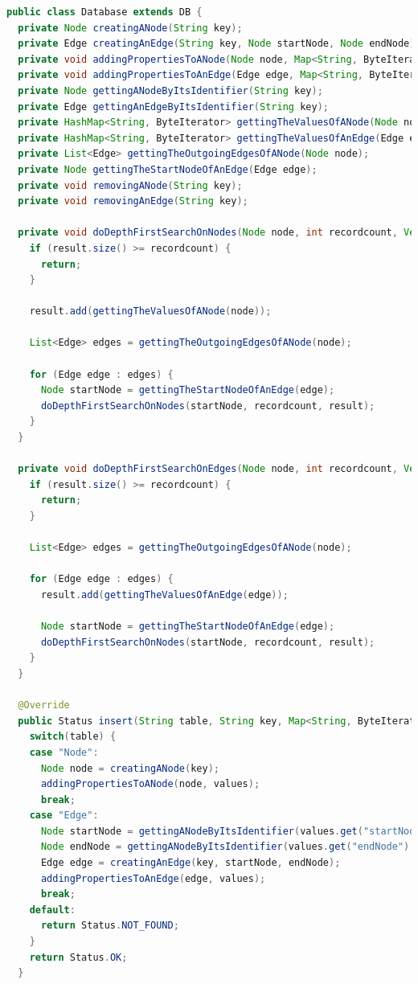 \begin{lstlisting}[language={Java},label={lst:databaseTemplate},caption={Generic example of a database implementation with the use of graph data.},captionpos=b]
public class Database extends DB {
  private Node creatingANode(String key);
  private Edge creatingAnEdge(String key, Node startNode, Node endNode);
  private void addingPropertiesToANode(Node node, Map<String, ByteIterator> values);
  private void addingPropertiesToAnEdge(Edge edge, Map<String, ByteIterator> values);
  private Node gettingANodeByItsIdentifier(String key);
  private Edge gettingAnEdgeByItsIdentifier(String key);
  private HashMap<String, ByteIterator> gettingTheValuesOfANode(Node node);
  private HashMap<String, ByteIterator> gettingTheValuesOfAnEdge(Edge edge);
  private List<Edge> gettingTheOutgoingEdgesOfANode(Node node);
  private Node gettingTheStartNodeOfAnEdge(Edge edge);
  private void removingANode(String key);
  private void removingAnEdge(String key);

  private void doDepthFirstSearchOnNodes(Node node, int recordcount, Vector<HashMap<String, ByteIterator>> result) {
    if (result.size() >= recordcount) {
      return;
    }

    result.add(gettingTheValuesOfANode(node));

    List<Edge> edges = gettingTheOutgoingEdgesOfANode(node);

    for (Edge edge : edges) {
      Node startNode = gettingTheStartNodeOfAnEdge(edge);
      doDepthFirstSearchOnNodes(startNode, recordcount, result);
    }
  }

  private void doDepthFirstSearchOnEdges(Node node, int recordcount, Vector<HashMap<String, ByteIterator>> result) {
    if (result.size() >= recordcount) {
      return;
    }

    List<Edge> edges = gettingTheOutgoingEdgesOfANode(node);

    for (Edge edge : edges) {
      result.add(gettingTheValuesOfAnEdge(edge));

      Node startNode = gettingTheStartNodeOfAnEdge(edge);
      doDepthFirstSearchOnNodes(startNode, recordcount, result);
    }
  }

  @Override
  public Status insert(String table, String key, Map<String, ByteIterator> values) {
    switch(table) {
    case "Node":
      Node node = creatingANode(key);
      addingPropertiesToANode(node, values);
      break;
    case "Edge":
      Node startNode = gettingANodeByItsIdentifier(values.get("startNode").toString());
      Node endNode = gettingANodeByItsIdentifier(values.get("endNode").toString());
      Edge edge = creatingAnEdge(key, startNode, endNode);
      addingPropertiesToAnEdge(edge, values);
      break;
    default:
      return Status.NOT_FOUND;
    }
    return Status.OK;
  }


\end{lstlisting}
